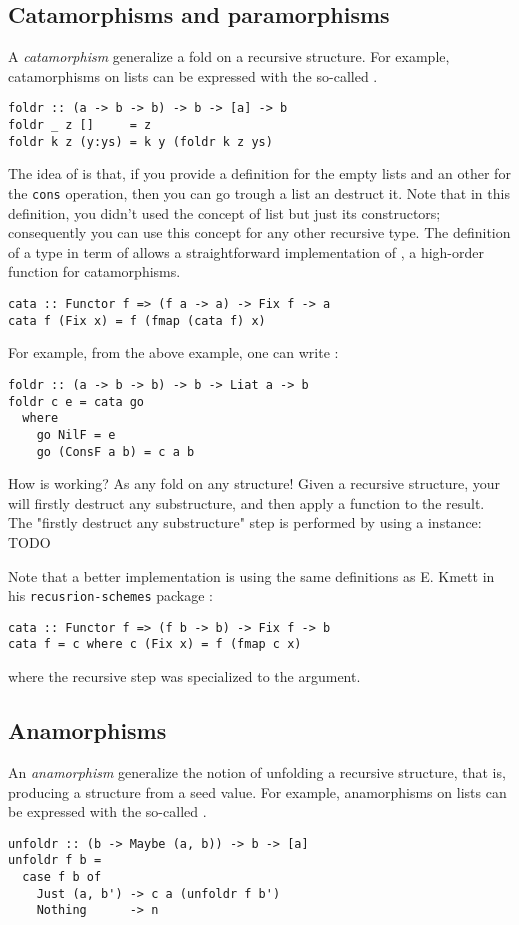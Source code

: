 \subsection{Catamorphisms and paramorphisms}
A \emph{catamorphism} generalize a fold on a recursive structure. For example, catamorphisms on lists can be expressed with the so-called .
\begin{verbatim}
foldr :: (a -> b -> b) -> b -> [a] -> b
foldr _ z []     = z
foldr k z (y:ys) = k y (foldr k z ys)
\end{verbatim}
The idea of  is that, if you provide a definition for the empty lists and an other for the \verb|cons| operation, then you can go trough a list an destruct it. Note that in this definition, you didn't used the concept of list but just its constructors; consequently you can use this concept for any other recursive type. The definition of a type in term of  allows a straightforward implementation of , a high-order function for catamorphisms.

\begin{verbatim}
cata :: Functor f => (f a -> a) -> Fix f -> a
cata f (Fix x) = f (fmap (cata f) x)
\end{verbatim}
For example,  from the above example, one can write :
\begin{verbatim}
foldr :: (a -> b -> b) -> b -> Liat a -> b
foldr c e = cata go
  where
    go NilF = e
    go (ConsF a b) = c a b
\end{verbatim}

How  is working? As any fold on any structure! Given a recursive structure, your will firstly destruct any substructure, and then apply a function to the result. The "firstly destruct any substructure" step is performed by using a  instance: TODO

Note that a better implementation is using the same definitions as E. Kmett in his \verb|recusrion-schemes| package \cite{ekmett:eschems}:

\begin{verbatim}
cata :: Functor f => (f b -> b) -> Fix f -> b
cata f = c where c (Fix x) = f (fmap c x)
\end{verbatim}

\noindent
where the recursive step was specialized to the  argument.

\subsection{Anamorphisms}
An \emph{anamorphism} generalize the notion of unfolding a recursive structure, that is, producing a structure from a seed value.
For example, anamorphisms on lists can be expressed with the so-called .
\begin{verbatim}
unfoldr :: (b -> Maybe (a, b)) -> b -> [a]
unfoldr f b =
  case f b of
    Just (a, b') -> c a (unfoldr f b')
    Nothing      -> n
\end{verbatim}

